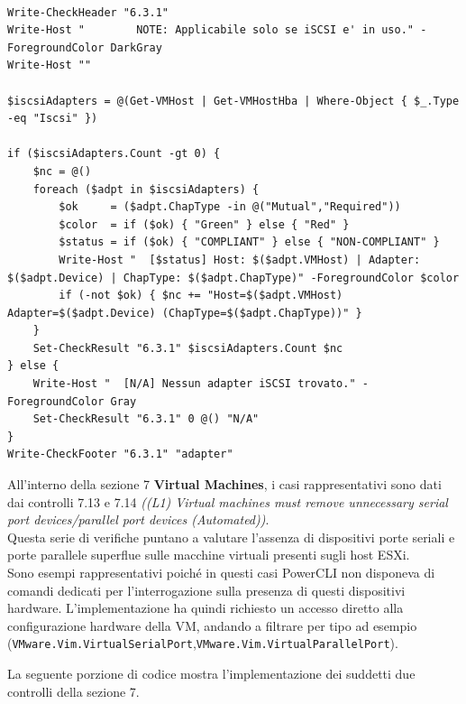 \documentclass[a4paper,11pt]{report}
\begin{document}
\begin{lstlisting}[style=azcli, caption={Controllo 6.3.1 sull'autenticazione CHAP bidirezionale}, label={lst:chap}]

Write-CheckHeader "6.3.1" 
Write-Host "        NOTE: Applicabile solo se iSCSI e' in uso." -ForegroundColor DarkGray
Write-Host ""

$iscsiAdapters = @(Get-VMHost | Get-VMHostHba | Where-Object { $_.Type -eq "Iscsi" })

if ($iscsiAdapters.Count -gt 0) {
    $nc = @()
    foreach ($adpt in $iscsiAdapters) {
        $ok     = ($adpt.ChapType -in @("Mutual","Required"))
        $color  = if ($ok) { "Green" } else { "Red" }
        $status = if ($ok) { "COMPLIANT" } else { "NON-COMPLIANT" }
        Write-Host "  [$status] Host: $($adpt.VMHost) | Adapter: $($adpt.Device) | ChapType: $($adpt.ChapType)" -ForegroundColor $color
        if (-not $ok) { $nc += "Host=$($adpt.VMHost) Adapter=$($adpt.Device) (ChapType=$($adpt.ChapType))" }
    }
    Set-CheckResult "6.3.1" $iscsiAdapters.Count $nc
} else {
    Write-Host "  [N/A] Nessun adapter iSCSI trovato." -ForegroundColor Gray
    Set-CheckResult "6.3.1" 0 @() "N/A"
}
Write-CheckFooter "6.3.1" "adapter"
\end{lstlisting}

All'interno della sezione 7 \textbf{Virtual Machines}, i casi rappresentativi sono dati dai controlli 7.13 e 7.14 \textit{((L1) Virtual machines must remove unnecessary serial port devices/parallel port devices (Automated))}. \\
Questa serie di verifiche puntano a valutare l'assenza di dispositivi porte seriali e porte parallele superflue sulle macchine virtuali presenti sugli host ESXi. \\

Sono esempi rappresentativi poiché in questi casi PowerCLI non disponeva di comandi dedicati per l'interrogazione sulla presenza di questi dispositivi hardware. L'implementazione ha quindi richiesto un accesso diretto alla configurazione hardware della VM, andando a filtrare per tipo ad esempio \\ (\texttt{VMware.Vim.VirtualSerialPort},\texttt{VMware.Vim.VirtualParallelPort}).

La seguente porzione di codice mostra l'implementazione dei suddetti due controlli della sezione 7.
\end{document}
